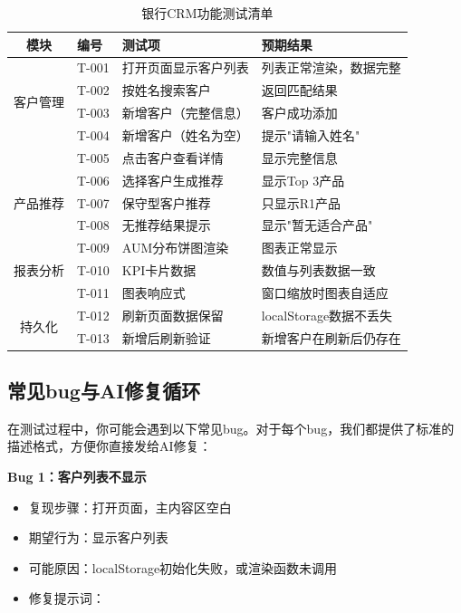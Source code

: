 \begin{table}[H]
\centering
\small
\begin{tabular}{clp{5.5cm}l}
\toprule
\textbf{模块} & \textbf{编号} & \textbf{测试项} & \textbf{预期结果} \\
\midrule
\multirow{4}{*}{客户管理} & T-001 & 打开页面显示客户列表 & 列表正常渲染，数据完整 \\
 & T-002 & 按姓名搜索客户 & 返回匹配结果 \\
 & T-003 & 新增客户（完整信息） & 客户成功添加 \\
 & T-004 & 新增客户（姓名为空） & 提示"请输入姓名" \\
 & T-005 & 点击客户查看详情 & 显示完整信息 \\
\midrule
\multirow{3}{*}{产品推荐} & T-006 & 选择客户生成推荐 & 显示Top 3产品 \\
 & T-007 & 保守型客户推荐 & 只显示R1产品 \\
 & T-008 & 无推荐结果提示 & 显示"暂无适合产品" \\
\midrule
\multirow{3}{*}{报表分析} & T-009 & AUM分布饼图渲染 & 图表正常显示 \\
 & T-010 & KPI卡片数据 & 数值与列表数据一致 \\
 & T-011 & 图表响应式 & 窗口缩放时图表自适应 \\
\midrule
\multirow{2}{*}{持久化} & T-012 & 刷新页面数据保留 & localStorage数据不丢失 \\
 & T-013 & 新增后刷新验证 & 新增客户在刷新后仍存在 \\
\bottomrule
\end{tabular}
\caption{银行CRM功能测试清单}
\end{table}

\subsection{常见bug与AI修复循环}

在测试过程中，你可能会遇到以下常见bug。对于每个bug，我们都提供了标准的描述格式，方便你直接发给AI修复：

\textbf{Bug 1：客户列表不显示}
\begin{itemize}[leftmargin=2em]
  \item 复现步骤：打开页面，主内容区空白
  \item 期望行为：显示客户列表
  \item 可能原因：localStorage初始化失败，或渲染函数未调用
  \item 修复提示词：
\end{itemize}

